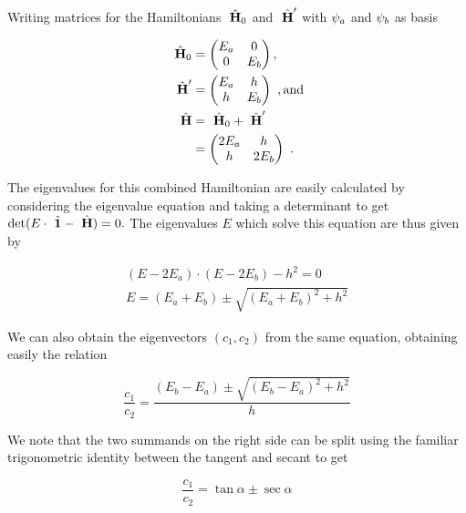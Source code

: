 \question
{}

\begin{alphaparts}

\questionpart
Writing matrices for the Hamiltonians $~\hat{\textbf{H}}_0$ and $~\hat{\textbf{H}}'$ with
$\psi_a$ and $\psi_b$ as basis

\begin{align}
    ~\hat{\textbf{H}}_0 &= \begin{pmatrix}
        E_a & 0 \\ 
        0   & E_b
    \end{pmatrix}, \\
    ~\hat{\textbf{H}}' &= \begin{pmatrix}
        E_a & h \\ 
        h   & E_b
    \end{pmatrix}~, \textnormal{and} \\
    ~\hat{\textbf{H}} &= ~\hat{\textbf{H}}_0 + ~\hat{\textbf{H}}' \nonumber \\
                 &= \begin{pmatrix}
                    2E_a & h \\ 
                    h   & 2E_b
                 \end{pmatrix}~.
\end{align}

The eigenvalues for this combined Hamiltonian are easily calculated by
considering the eigenvalue equation and taking a determinant to get
$\determinant(E \cdot \Identity - \Hamiltonian) = 0.$ The eigenvalues $E$ which
solve this equation are thus given by 

\begin{align}
    (E - 2E_a) \cdot (E - 2E_b) - h^2 = 0 \\
    E = (E_a + E_b) \pm \sqrt{(E_a + E_b)^2 + h^2}  
\end{align}

We can also obtain the eigenvectors $(c_1, c_2)$ from the same equation,
obtaining easily the relation

\begin{equation}
    \frac{c_1}{c_2} = \frac{(E_b - E_a) \pm \sqrt{(E_b - E_a)^2 + h^2} }{h}
\end{equation}

We note that the two summands on the right side can be split using the familiar
trigonometric identity between the tangent and secant to get

\begin{equation}
    \frac{c_1}{c_2} = \tan \alpha \pm \sec \alpha
\end{equation}


\end{alphaparts}
